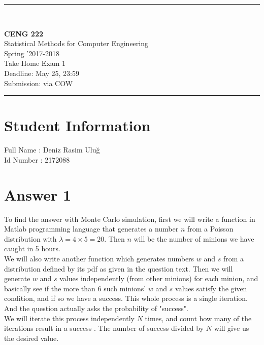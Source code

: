 \documentclass[12pt]{article}
\newcommand{\HRule}{\rule{\linewidth}{1mm}}
\begin{document}
\noindent
\HRule \\[3mm]
\begin{flushright}

                                         \LARGE \textbf{CENG 222}  \\[4mm]
                                         \Large Statistical Methods for Computer Engineering \\[4mm]
                                        \normalsize      Spring '2017-2018 \\
                                           \Large   Take Home Exam 1 \\
                    \normalsize Deadline: May 25, 23:59 \\
                    \normalsize Submission: via COW
\end{flushright}
\HRule

\section*{Student Information }
Full Name : Deniz Rasim Uluğ  \\
Id Number :  2172088 \\

\section*{Answer 1}

To find the answer with Monte Carlo simulation, first we will write a function in Matlab programming language that generates a number $n$ from a Poisson distribution with $\lambda=4\times5=20$. Then $n$ will be the number of minions we have caught in 5 hours. \\ We will also write another function which generates numbers $w$ and $s$ from a distribution defined by its pdf as given in the question text. Then we will generate $w$ and $s$ values independently (from other minions) for each minion, and basically see if the more than $6$ such minions' $w$ and $s$ values satisfy the given condition, and if so we have a success. This whole process is a single iteration. And the question actually asks the probability of "success".\\

We will iterate this process independently $N$ times, and count how many of the iterations result in a success . The number of success divided by $N$ will give us the desired value. \\
\end{document}
